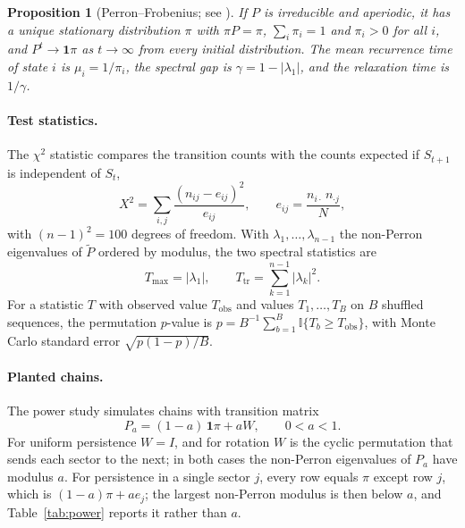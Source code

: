 \documentclass[11pt]{article}
\newtheorem{proposition}{Proposition}
\begin{document}
\begin{proposition}[Perron--Frobenius; see \cite{seneta2006,norris1998}]
\label{prop:pf}
If $P$ is irreducible and aperiodic, it has a unique stationary distribution $\pi$ with $\pi P = \pi$, $\sum_i \pi_i = 1$ and $\pi_i > 0$ for all $i$, and $P^t \to \mathbf 1\pi$ as $t \to \infty$ from every initial distribution. The mean recurrence time of state $i$ is $\mu_i = 1/\pi_i$, the spectral gap is $\gamma = 1 - |\lambda_1|$, and the relaxation time is $1/\gamma$.
\end{proposition}

\paragraph{Test statistics.} The $\chi^2$ statistic compares the transition counts with the counts expected if $S_{t+1}$ is independent of $S_t$,
\begin{equation}
X^2 = \sum_{i,j} \frac{(n_{ij} - e_{ij})^2}{e_{ij}}, \qquad e_{ij} = \frac{n_{i\cdot}\, n_{\cdot j}}{N},
\end{equation}
with $(n-1)^2 = 100$ degrees of freedom. With $\lambda_1, \dots, \lambda_{n-1}$ the non-Perron eigenvalues of $\tilde P$ ordered by modulus, the two spectral statistics are
\begin{equation}
T_{\max} = |\lambda_1|, \qquad T_{\mathrm{tr}} = \sum_{k=1}^{n-1} |\lambda_k|^2.
\end{equation}
For a statistic $T$ with observed value $T_{\mathrm{obs}}$ and values $T_1, \dots, T_B$ on $B$ shuffled sequences, the permutation $p$-value is $p = B^{-1}\sum_{b=1}^B \mathbb I\{T_b \ge T_{\mathrm{obs}}\}$, with Monte Carlo standard error $\sqrt{p(1-p)/B}$.

\paragraph{Planted chains.} The power study simulates chains with transition matrix
\begin{equation}
P_a = (1-a)\,\mathbf 1\pi + aW, \qquad 0 < a < 1.
\end{equation}
For uniform persistence $W = I$, and for rotation $W$ is the cyclic permutation that sends each sector to the next; in both cases the non-Perron eigenvalues of $P_a$ have modulus $a$. For persistence in a single sector $j$, every row equals $\pi$ except row $j$, which is $(1-a)\pi + a e_j$; the largest non-Perron modulus is then below $a$, and Table~\ref{tab:power} reports it rather than $a$.
\end{document}
